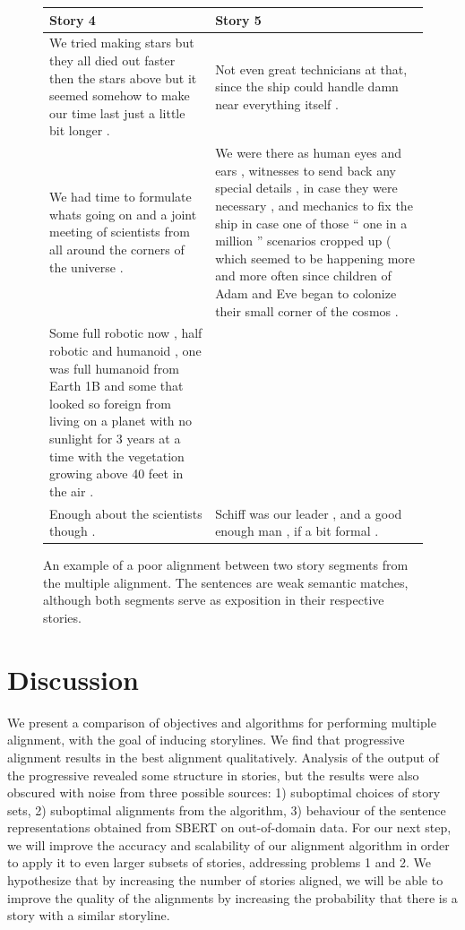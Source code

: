 \documentclass{article}
\begin{document}
\begin{figure}[h]
\centering
\small
\begin{tabular}{|p{}|p{}|}
\hline
\textbf{Story 4} & \textbf{Story 5}
\\
\hline
We tried making stars but they all died out faster then the stars above but it seemed somehow to make our time last just a little bit longer .
& Not even great technicians at that, since the ship could handle damn near everything itself .
\\
\hline
We had time to formulate whats going on and a joint meeting of scientists from all around the corners of the universe .
& We were there as human eyes and ears , witnesses to send back any special details , in case they were necessary , and mechanics to fix the ship in case one of those “ one in a million ” scenarios cropped up ( which seemed to be happening more and more often since children of Adam and Eve began to colonize their small corner of the cosmos .
\\
\hline
Some full robotic now , half robotic and humanoid , one was full humanoid from Earth 1B and some that looked so foreign from living on a planet with no sunlight for 3 years at a time with the vegetation growing above 40 feet in the air .
& \\
\hline
Enough about the scientists though .
& Schiff was our leader , and a good enough man , if a bit formal .
\\
\hline
\end{tabular}
\caption{
\label{fig:bad-alignment}
An example of a poor alignment between two story segments from the multiple alignment.
The sentences are weak semantic matches, although both segments
serve as exposition in their respective stories.
}
\end{figure}

\section{Discussion}
We present a comparison of objectives and algorithms for performing multiple alignment,
with the goal of inducing storylines.
We find that progressive alignment results in the best alignment qualitatively.
Analysis of the output of the progressive revealed some structure in stories,
but the results were also obscured with noise from three possible sources:
1) suboptimal choices of story sets, 2) suboptimal alignments from the algorithm, 
3) behaviour of the sentence representations obtained from SBERT on out-of-domain data.
For our next step, we will improve the accuracy and scalability of our alignment algorithm
in order to apply it to even larger subsets of stories, addressing problems 1 and 2.
We hypothesize that by increasing the number of stories aligned, we will be able to 
improve the quality of the alignments by increasing the probability that there is a story
with a similar storyline.

\newpage


\end{document}
